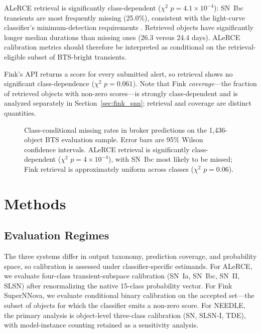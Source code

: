 \documentclass[twocolumn]{aastex631}
\begin{document}
ALeRCE retrieval is significantly class-dependent ($\chi^2$
$p = 4.1 \times 10^{-4}$): SN~Ibc transients are most frequently
missing (25.0\%), consistent with the light-curve classifier's
minimum-detection requirements \citep{sanchezsaez2021}. Retrieved
objects have significantly longer median durations than missing
ones (26.3 versus 24.4 days). ALeRCE calibration metrics should
therefore be interpreted as conditional on the retrieval-eligible
subset of BTS-bright transients.

Fink's API returns a score for every submitted alert, so retrieval
shows no significant class-dependence ($\chi^2$ $p = 0.061$).
Note that Fink \textit{coverage}---the fraction of retrieved objects
with non-zero scores---is strongly class-dependent and is analyzed
separately in Section~\ref{sec:fink_snn}; retrieval and coverage
are distinct quantities.

\begin{figure}[t]
\caption{Class-conditional missing rates in broker predictions on the
1{,}436-object BTS evaluation sample. Error bars are 95\% Wilson
confidence intervals. ALeRCE retrieval is significantly class-dependent
($\chi^2$ $p = 4 \times 10^{-4}$), with SN~Ibc most likely to be missed;
Fink retrieval is approximately uniform across classes
($\chi^2$ $p = 0.06$). \label{fig:missingness}}
\end{figure}


\section{Methods}\label{sec:methods}

\subsection{Evaluation Regimes}\label{sec:regimes}

The three systems differ in output taxonomy, prediction coverage,
and probability space, so calibration is assessed under
classifier-specific estimands. For ALeRCE, we evaluate
four-class transient-subspace calibration (SN~Ia, SN~Ibc, SN~II,
SLSN) after renormalizing the native 15-class probability vector.
For Fink SuperNNova, we evaluate conditional binary calibration on
the accepted set---the subset of objects for which the classifier
emits a non-zero score. For NEEDLE, the primary analysis is
object-level three-class calibration (SN, SLSN-I, TDE), with
model-instance counting retained as a sensitivity analysis.
\end{document}
